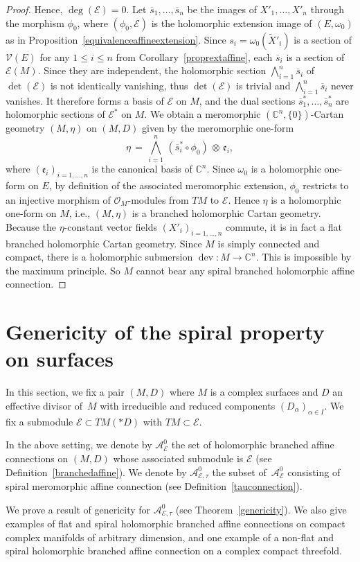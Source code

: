 \documentclass[10pt,a4paper]{amsart}
\numberwithin{equation}{section}
\begin{document}
\begin{proof}
Hence, $\deg (\mathcal{E})=0$. Let $\overline{s}_1,\dots,\overline{s}_n$ be the images of $X'_1,\dots,X'_n$ through the morphism $\phi_0$, where $(\phi_0,\mathcal{E})$ is the holomorphic extension image of $(E,\omega_0)$ as in Proposition~\ref{equivalenceaffineextension}. Since $s_i=\omega_0(\tilde{X}'_i)$ is a section of $\mathcal{V}(E)$ for any $1\leq i \leq n$ from Corollary~\ref{proprextaffine}, each $\overline{s}_i$ is a section of~$\mathcal{E}(M)$. Since they are independent, the holomorphic section $\bigwedge_{i=1}^{n} \overline{s}_i$ of $\det(\mathcal{E})$ is not identically vanishing, thus $\det(\mathcal{E})$ is trivial and $\bigwedge_{i=1}^{n}\overline{s}_i$ never vanishes. It therefore forms a basis of $\mathcal{E}$ on $M$, and the dual sections $\overline{s}_1^*,\dots,\overline{s}_n^*$ are holomorphic sections of $\mathcal{E}^*$ on $M$. We obtain a meromorphic $(\mathbb{C}^n,\{0\})$-Cartan geometry $(M,\eta)$ on $(M,D)$ given by the meromorphic one-form
\[ \eta \,=\, \bigwedge_{i=1}^{n} \,(\overline{s}_i^* \circ \phi_0)\, \otimes \,\mathfrak{e}_i,\]
 where $(\mathfrak{e}_i)_{i=1,\dots,n}$ is the canonical basis of $\mathbb{C}^n$. Since $\omega_0$ is a holomorphic one-form on $E$, by definition of the associated meromorphic extension, $\phi_0$ restricts to an injective morphism of $\mathcal{O}_M$-modules from $TM$ to $\mathcal{E}$. Hence $\eta$ is a holomorphic one-form on $M$, i.e., $(M,\eta)$ is a branched holomorphic Cartan geometry. Because the $\eta$-constant vector fields $(X'_i)_{i=1,\dots,n}$ commute, it is in fact a flat branched holomorphic Cartan geometry. Since $M$ is simply connected and compact, there is a holomorphic submersion $\operatorname{dev}\colon M \longrightarrow \mathbb{C}^n$. This is impossible by the maximum principle. So $M$ cannot bear any spiral branched holomorphic affine connection.
\end{proof}

\section{Genericity of the spiral property on surfaces}
In this section, we fix a pair $(M,D)$ where $M$ is a complex surfaces and $D$ an effective divisor of~$M$ with irreducible and reduced components $(D_\alpha)_{\alpha\in I}$. We fix a submodule $\mathcal{E} \subset TM(* D)$ with $TM\subset \mathcal{E}$.
\begin{Definition}\label{A0} In the above setting, we denote by $\mathcal{A}^0_{\mathcal{E}}$ the set of holomorphic branched affine connections on $(M,D)$ whose associated submodule is $\mathcal{E}$ (see Definition~\ref{branchedaffine}). We denote by $\mathcal{A}^0_{\mathcal{E},\tau}$ the subset of~$\mathcal{A}^0_{\mathcal{E}}$ consisting of spiral meromorphic affine connection (see Definition~\ref{tauconnection}). \end{Definition} We prove a result of genericity for $\mathcal{A}^0_{\mathcal{E},\tau}$ (see Theorem~\ref{genericity}). We also give examples of flat and spiral holomorphic branched affine connections on compact complex manifolds of arbitrary dimension, and one example of a non-flat and spiral holomorphic branched affine connection on a complex compact threefold.
\end{document}

